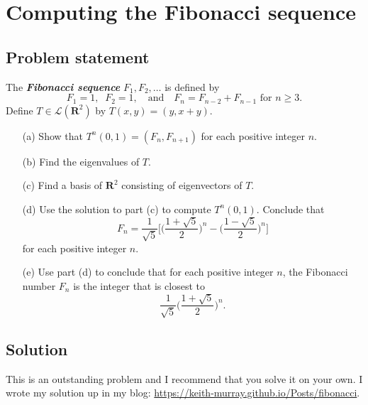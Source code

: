 \documentclass{article}
\begin{document}
\clearpage

\renewcommand{\thesection}{16}
\section{Computing the Fibonacci sequence}
\subsection*{Problem statement}
The \textbf{\textit{Fibonacci sequence}} $F_1,F_2,\ldots$ is defined by
\[F_1=1,\;\;F_2=1,\quad\text{and}\quad F_n=F_{n-2}+F_{n-1}\text{ for }n\geq3.\]
Define $T\in\mathcal{L}(\mathbf{R}^2)$ by $T(x,y)=(y,x+y)$.

\begin{itemize}
    \item[(a)] Show that $T^n(0,1)=(F_n,F_{n+1})$ for each positive integer $n$.
    \item[(b)] Find the eigenvalues of $T$.
    \item[(c)] Find a basis of $\mathbf{R}^2$ consisting of eigenvectors of $T$.
    \item[(d)] Use the solution to part (c) to compute $T^n(0,1)$. Conclude that \[F_n=\frac{1}{\sqrt{5}}\Big[\Big(\frac{1+\sqrt{5}}{2}\Big)^n-\Big(\frac{1-\sqrt{5}}{2}\Big)^n\Big]\] for each positive integer $n$.
    \item[(e)] Use part (d) to conclude that for each positive integer $n$, the Fibonacci number $F_n$ is the integer that is closest to \[\frac{1}{\sqrt{5}}\Big(\frac{1+\sqrt{5}}{2}\Big)^n.\]
\end{itemize}

\subsection*{Solution}
This is an outstanding problem and I recommend that you solve it on your own. I wrote my solution up in my blog: \url{https://keith-murray.github.io/Posts/fibonacci}.
\end{document}
